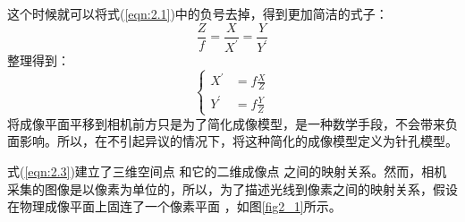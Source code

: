 这个时候就可以将式(\ref{eqn:2.1})中的负号去掉，得到更加简洁的式子：
\begin{equation}
\label{eqn:2.2}
	\frac{Z}{f}=\frac{X}{X^{\prime}}=\frac{Y}{Y^{\prime}}
\end{equation}
整理得到：
\begin{equation}
\label{eqn:2.3}
	\left\{\begin{aligned} X^{\prime} &=f \frac{X}{Z} \\ Y^{\prime} &=f \frac{Y}{Z} \end{aligned}\right.	
\end{equation}
将成像平面平移到相机前方只是为了简化成像模型，是一种数学手段，不会带来负面影响。所以，在不引起异议的情况下，将这种简化的成像模型定义为针孔模型。

式(\ref{eqn:2.3})建立了三维空间点 和它的二维成像点 之间的映射关系。然而，相机采集的图像是以像素为单位的，所以，为了描述光线到像素之间的映射关系，假设在物理成像平面上固连了一个像素平面 ，如图\ref{fig2_1}所示。

